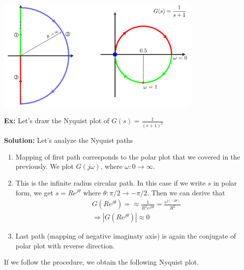 \documentclass{article}
\begin{document}
  \begin{minipage}[h]{1\linewidth}
    \begin{center}
      \includegraphics[width=0.75\textwidth]{ex2}
    \end{center}
  \end{minipage}

\vspace{12 pt}

\textbf{Ex:} Let's draw the Nyquist plot of 
$G(s) = \frac{1}{(s+1)^2}$ 

\textbf{Solution:} Let's analyze the Nyquist paths
%
\begin{enumerate}
  \item Mapping of first path corresponds to the polar plot that we covered in the previously. We plot $G(j \omega)$, where $\omega : 0 \to
    \infty$. 
%
  \item This is the infinite radius circular path. In this case if we write $s$ in polar form, we get 
   $s = R e^{j \theta}$ where $\theta : \pi/2 \to -\pi/2$.  Then 
   we can derive that  
   \begin{align*}
     & G \left( R e^{j \theta} \right) = \approx \frac{1}{R^2 e^{j
       2 \theta}} = \frac{e^{j (-2 \theta)}}{R^2}
       \\
    &\Rightarrow | G \left( R e^{j \theta} \right) | \approx 0
   \end{align*}
   \item Last path (mapping of negative imaginaty axis) is again
   the conjugate of polar plot with reverse direction. 
\end{enumerate}

If we follow the procedure, we obtain the following Nyquist plot. 

\vspace{6 pt}
\end{document}
